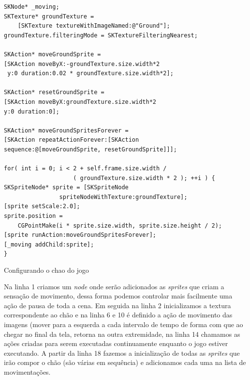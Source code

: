\documentclass[a4paper,12pt,brazil,oneside]{book}
\begin{document}
\begin{listing}[H]
\begin{verbatim}
SKNode* _moving;
SKTexture* groundTexture = 
	[SKTexture textureWithImageNamed:@"Ground"];
groundTexture.filteringMode = SKTextureFilteringNearest;
        
SKAction* moveGroundSprite = 
[SKAction moveByX:-groundTexture.size.width*2
 y:0 duration:0.02 * groundTexture.size.width*2];
 
SKAction* resetGroundSprite = 
[SKAction moveByX:groundTexture.size.width*2 
y:0 duration:0];

SKAction* moveGroundSpritesForever = 
[SKAction repeatActionForever:[SKAction 
sequence:@[moveGroundSprite, resetGroundSprite]]];
           
for( int i = 0; i < 2 + self.frame.size.width / 
					( groundTexture.size.width * 2 ); ++i ) {
SKSpriteNode* sprite = [SKSpriteNode 
				spriteNodeWithTexture:groundTexture];
[sprite setScale:2.0];
sprite.position = 
	CGPointMake(i * sprite.size.width, sprite.size.height / 2);
[sprite runAction:moveGroundSpritesForever];
[_moving addChild:sprite];
}
\end{verbatim}
\caption{Configurando o chao do jogo}
\end{listing}

Na linha 1 criamos um \emph{node} onde serão adicionados as \emph{sprites} que criam a sensação de movimento, dessa forma podemos controlar mais facilmente uma ação de pausa de toda a cena. Em seguida na linha 2 inicializamos a textura correspondente ao chão e na linha 6 e 10 é definido a ação de movimento das imagens (mover para a esquerda a cada intervalo de tempo de forma com que ao chegar no final da tela, retorna na outra extremidade, na linha 14 chamamos as ações criadas para serem executadas continuamente enquanto o jogo estiver executando.
A partir da linha 18 fazemos a inicialização de todas as \emph{sprites} que irão compor o chão (são várias em sequência) e adicionamos cada uma na lista de movimentações.
\end{document}
